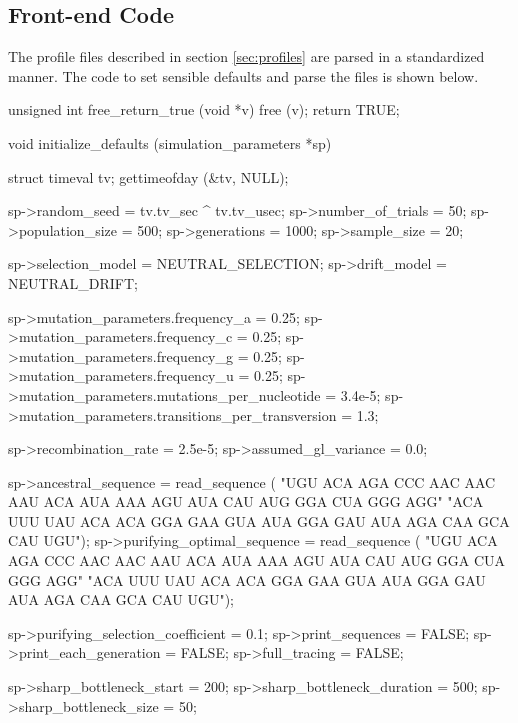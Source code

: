 \documentclass{article}
\begin{document}
    \subsection{Front-end Code}

      The profile files described in section \ref{sec:profiles} are parsed in a
      standardized manner. The code to set sensible defaults and parse the files
      is shown below.

\begin{ccode}
unsigned int free_return_true (void *v) {
  free (v);
  return TRUE;
}

void initialize_defaults (simulation_parameters *sp) {
  struct timeval tv;
  gettimeofday (&tv, NULL);

  sp->random_seed                          = tv.tv_sec ^ tv.tv_usec;
  sp->number_of_trials                     = 50;
  sp->population_size                      = 500;
  sp->generations                          = 1000;
  sp->sample_size                          = 20;

  sp->selection_model                      = NEUTRAL_SELECTION;
  sp->drift_model                          = NEUTRAL_DRIFT;

  sp->mutation_parameters.frequency_a      = 0.25;
  sp->mutation_parameters.frequency_c      = 0.25;
  sp->mutation_parameters.frequency_g      = 0.25;
  sp->mutation_parameters.frequency_u      = 0.25;
  sp->mutation_parameters.mutations_per_nucleotide = 3.4e-5;
  sp->mutation_parameters.transitions_per_transversion = 1.3;

  sp->recombination_rate                   = 2.5e-5;
  sp->assumed_gl_variance                  = 0.0;

  sp->ancestral_sequence = read_sequence (
    "UGU ACA AGA CCC AAC AAC AAU ACA AUA AAA AGU AUA CAU AUG GGA CUA GGG AGG"
    "ACA UUU UAU ACA ACA GGA GAA GUA AUA GGA GAU AUA AGA CAA GCA CAU UGU");
  sp->purifying_optimal_sequence = read_sequence (
    "UGU ACA AGA CCC AAC AAC AAU ACA AUA AAA AGU AUA CAU AUG GGA CUA GGG AGG"
    "ACA UUU UAU ACA ACA GGA GAA GUA AUA GGA GAU AUA AGA CAA GCA CAU UGU");

  sp->purifying_selection_coefficient      = 0.1;
  sp->print_sequences                      = FALSE;
  sp->print_each_generation                = FALSE;
  sp->full_tracing                         = FALSE;

  sp->sharp_bottleneck_start               = 200;
  sp->sharp_bottleneck_duration            = 500;
  sp->sharp_bottleneck_size                = 50;

}
\end{ccode}
\end{document}
